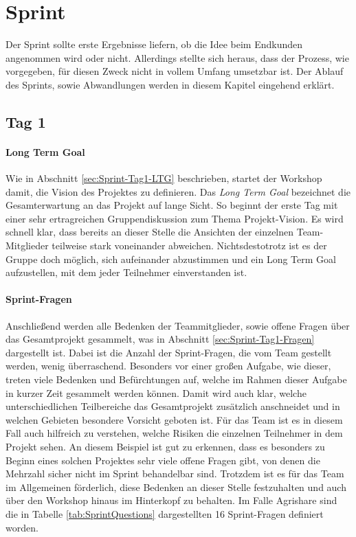\section{Sprint}
\label{sec:Sprint-Umsetzung}
Der Sprint sollte erste Ergebnisse liefern, ob die Idee beim Endkunden angenommen wird oder nicht. Allerdings stellte sich heraus, dass der Prozess, wie vorgegeben, für diesen Zweck nicht in vollem Umfang umsetzbar ist. Der Ablauf des Sprints, sowie Abwandlungen werden in diesem Kapitel eingehend erklärt.
\subsection*{\label{sec:Sprint-Umsetzung-Tag1}\thesubsection\quad Tag 1}
\paragraph{Long Term Goal}
Wie in Abschnitt \ref{sec:Sprint-Tag1-LTG} beschrieben, startet der Workshop damit, die Vision des Projektes zu definieren. Das \textit{Long Term Goal} bezeichnet die Gesamterwartung an das Projekt auf lange Sicht. So beginnt der erste Tag mit einer sehr ertragreichen Gruppendiskussion zum Thema Projekt-Vision. Es wird schnell klar, dass bereits an dieser Stelle die Ansichten der einzelnen Team-Mitglieder teilweise stark voneinander abweichen. Nichtsdestotrotz ist es der Gruppe doch möglich, sich aufeinander abzustimmen und ein Long Term Goal aufzustellen, mit dem jeder Teilnehmer einverstanden ist.
\paragraph{Sprint-Fragen}
Anschließend werden alle Bedenken der Teammitglieder, sowie offene Fragen über das Gesamtprojekt gesammelt, was in Abschnitt \ref{sec:Sprint-Tag1-Fragen} dargestellt ist. 
Dabei ist die Anzahl der Sprint-Fragen, die vom Team gestellt werden, wenig überraschend. Besonders vor einer großen Aufgabe, wie dieser, treten viele Bedenken und Befürchtungen auf, welche im Rahmen dieser Aufgabe in kurzer Zeit gesammelt werden können. Damit wird auch klar, welche unterschiedlichen Teilbereiche das Gesamtprojekt zusätzlich anschneidet und in welchen Gebieten besondere Vorsicht geboten ist. Für das Team ist es in diesem Fall auch hilfreich zu verstehen, welche Risiken die einzelnen Teilnehmer in dem Projekt sehen. An diesem Beispiel ist gut zu erkennen, dass es besonders zu Beginn eines solchen Projektes sehr viele offene Fragen gibt, von denen die Mehrzahl sicher nicht im Sprint behandelbar sind. Trotzdem ist es für das Team im Allgemeinen förderlich, diese Bedenken an dieser Stelle festzuhalten und auch über den Workshop hinaus im Hinterkopf zu behalten. Im Falle Agrishare sind die in Tabelle \ref{tab:SprintQuestions} dargestellten 16 Sprint-Fragen definiert worden.

